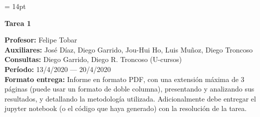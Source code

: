 \documentclass[11pt,letterpaper]{article}
\begin{document}
\pagestyle{fancy}
\fancyhf{}

\headheight = 14pt
\begin{center}
\large {\textbf{Tarea 1}}\\
\end{center}
\textbf{Profesor:} Felipe Tobar\\ 
\textbf{Auxiliares:} José Díaz, Diego Garrido, Jou-Hui Ho, Luis Muñoz, Diego Troncoso \\
\textbf{Consultas:} Diego Garrido,  Diego R. Troncoso  (U-cursos)\\
\textbf{Período:} 13/4/2020 --- 20/4/2020 \\

\noindent\textbf{Formato entrega:} Informe en formato PDF, con una extensión máxima de 3 páginas (puede usar un formato de doble columna), presentando y analizando sus resultados, y detallando la metodología utilizada. Adicionalmente debe entregar el jupyter notebook (o el código que haya generado) con la resolución de la tarea.

\vspace{5mm}
\end{document}
